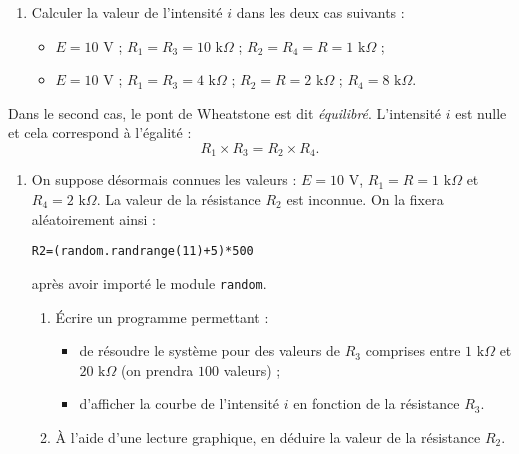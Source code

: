 \documentclass[11pt]{article}
\begin{document}
\begin{enumerate}[resume]
	\item Calculer la valeur de l'intensité $i$ dans les deux cas suivants :
		\begin{itemize}
			\medskip\item[\textbullet] $E = 10$ V ; $R_1 = R_3 = 10 \text{ k} \Omega$ ; $R_2 = R_4 = R = 1 \text{ k} \Omega$ ;
			\medskip\item[\textbullet] $E = 10$ V ; $R_1 = R_3 = 4 \text{ k} \Omega$ ; $R_2 = R = 2 \text{ k} \Omega$ ; $R_4= 8 \text{ k} \Omega$.
		\end{itemize}
\end{enumerate}
Dans le second cas, le pont de Wheatstone est dit \textit{équilibré}. L'intensité $i$ est nulle et cela correspond à l'égalité :
\[ R_1\times R_3=R_2\times R_4. \]
\begin{enumerate}[resume]
	\item On suppose désormais connues les valeurs : $E = 10$ V, $R_1 = R = 1 \text{ k} \Omega$ et $R_4= 2 \text{ k} \Omega$. La valeur de la résistance $R_2$ est inconnue. On la fixera aléatoirement ainsi :
		\begin{center}
			\texttt{R2=(random.randrange(11)+5)*500}
		\end{center}
		après avoir importé le module \texttt{random}.
		\begin{enumerate}
			\item \'{E}crire un programme permettant :
				\begin{itemize}
					\medskip\item[\textbullet] de résoudre le système pour des valeurs de $R_3$ comprises entre $1\text{ k} \Omega$ et $20\text{ k} \Omega$ (on prendra $100$ valeurs) ;
					\medskip\item[\textbullet] d'afficher la courbe de l'intensité $i$ en fonction de la résistance $R_3$.
				\end{itemize}
			\smallskip\item \`{A} l'aide d'une lecture graphique, en déduire la valeur de la résistance $R_2$.
		\end{enumerate}
\end{enumerate}
\end{document}

